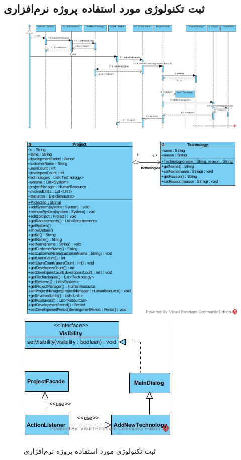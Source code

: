 \begin{landscape}
\newpage
\section{ثبت تکنولوژی مورد استفاده پروژه نرم‌افزاری}
\begin{figure}[H]
	\centering
	\includegraphics[scale=0.7]{img/sequence-design/AddTechnology}
\end{figure}
\begin{figure}[H]
	\centering
	\includegraphics[scale=0.5]{img/sequence-design/AddTechnologyC}
	\includegraphics[scale=0.7]{img/sequence-design/AddTechnologyUI}
	\caption{ثبت تکنولوژی مورد استفاده پروژه نرم‌افزاری}
\end{figure}


\end{landscape}
